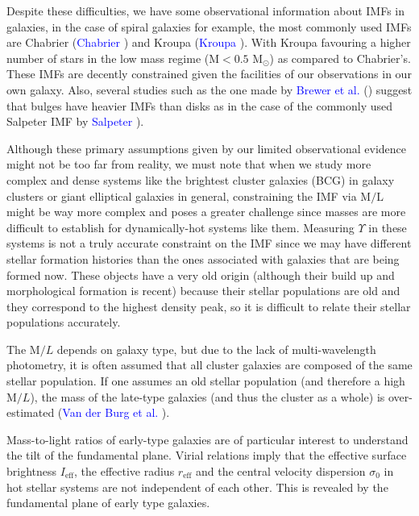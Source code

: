 Despite these difficulties, we have some observational information about IMFs in galaxies, in the case of spiral galaxies for example, the most commonly used IMFs are Chabrier (\textcolor{blue}{Chabrier} \citeyear{Reference31}) and Kroupa (\textcolor{blue}{Kroupa} \citeyear{Reference30}). With Kroupa favouring a higher number of stars in the low mass regime ($\textrm{M}<0.5$ $\textrm{M}_{\odot}$) as compared to Chabrier's. These IMFs are decently constrained given the facilities of our observations in our own galaxy. Also, several studies such as the one made by \textcolor{blue}{Brewer et al.} (\citeyear{Reference16}) suggest that bulges have heavier IMFs than disks as in the case of the commonly used Salpeter IMF by \textcolor{blue}{Salpeter} \citeyear{Reference33}). 

Although these primary assumptions given by our limited observational evidence might not be too far from reality, we must note that when we study more complex and dense systems like the brightest cluster galaxies (BCG) in galaxy clusters or giant elliptical galaxies in general, constraining the IMF via $\textrm{M}/\textrm{L}$ might be way more complex and poses a greater challenge since masses are more difficult to establish for dynamically-hot systems like them. Measuring $\Upsilon$ in these systems is not a truly accurate constraint on the IMF since we may have different stellar formation histories than the ones associated with galaxies that are being formed now. These objects have a very old origin (although their build up and morphological formation is recent) because their stellar populations are old and they correspond to the highest density peak, so it is difficult to relate their stellar populations accurately.

The $\text{M}/L$ depends on galaxy type, but due to the lack of multi-wavelength photometry, it is often assumed that all cluster galaxies are composed of the same stellar population. If one assumes an old stellar population (and therefore a high $\text{M}/L$), the mass of the late-type galaxies (and thus the cluster as a whole) is over-estimated (\textcolor{blue}{Van der Burg et al.} \citeyear{Reference2}).

Mass-to-light ratios of early-type galaxies are of particular interest to understand the tilt of the fundamental plane. Virial relations imply that the effective surface brightness $I_{\text{eff}}$, the effective radius $r_{\text{eff}}$ and the central velocity dispersion $\sigma_{0}$ in hot stellar systems are not independent of each other. This is revealed by the fundamental plane of early type galaxies.

